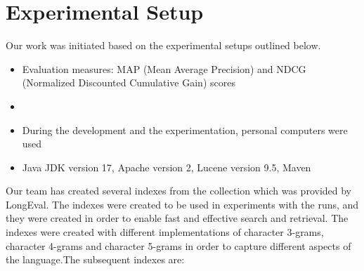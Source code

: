 \section{Experimental Setup}
\label{sec:setup}

Our work was initiated based on the experimental setups outlined below.
\begin{itemize}
	\item Evaluation measures: MAP (Mean Average Precision) and NDCG (Normalized Discounted Cumulative Gain) scores
	\item \citep[Repository]{jihuming}
	\item During the development and the experimentation, personal computers were used
	\item Java JDK version 17, Apache version 2, Lucene version 9.5, Maven
\end{itemize}
Our team has created several indexes from the collection which was provided by LongEval. The indexes were created to be used in experiments with the runs, and they were created in order to enable fast and effective search and retrieval. The indexes were created with different implementations of character 3-grams,  character 4-grams and  character 5-grams in order to capture different aspects of the language.The subsequent indexes are:
